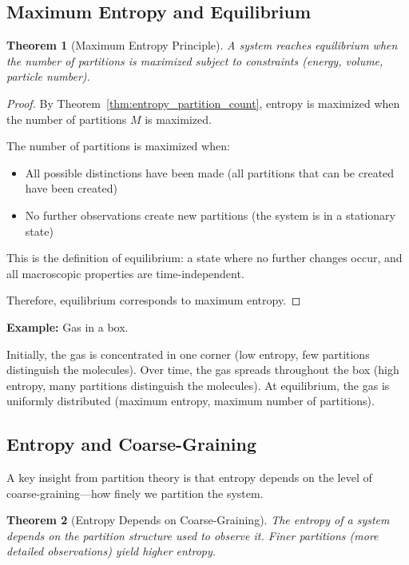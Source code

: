 \documentclass[twocolumn,10pt]{article}
\newtheorem{theorem}{Theorem}[section]
\theoremstyle{definition}
\theoremstyle{remark}
\begin{document}
\subsection{Maximum Entropy and Equilibrium}

\begin{theorem}[Maximum Entropy Principle]
\label{thm:maximum_entropy}
A system reaches equilibrium when the number of partitions is maximized subject to constraints (energy, volume, particle number).
\end{theorem}

\begin{proof}
By Theorem~\ref{thm:entropy_partition_count}, entropy is maximized when the number of partitions $M$ is maximized.

The number of partitions is maximized when:
\begin{itemize}
\item All possible distinctions have been made (all partitions that can be created have been created)
\item No further observations create new partitions (the system is in a stationary state)
\end{itemize}

This is the definition of equilibrium: a state where no further changes occur, and all macroscopic properties are time-independent.

Therefore, equilibrium corresponds to maximum entropy.
\end{proof}

\noindent\textbf{Example:} Gas in a box.

Initially, the gas is concentrated in one corner (low entropy, few partitions distinguish the molecules). Over time, the gas spreads throughout the box (high entropy, many partitions distinguish the molecules). At equilibrium, the gas is uniformly distributed (maximum entropy, maximum number of partitions).

\subsection{Entropy and Coarse-Graining}

A key insight from partition theory is that entropy depends on the level of coarse-graining—how finely we partition the system.

\begin{theorem}[Entropy Depends on Coarse-Graining]
\label{thm:entropy_coarse_graining}
The entropy of a system depends on the partition structure used to observe it. Finer partitions (more detailed observations) yield higher entropy.
\end{theorem}
\end{document}
